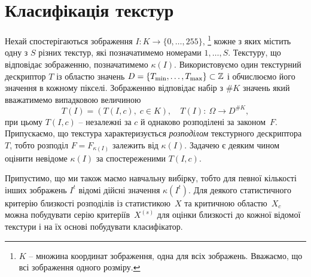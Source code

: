 
\section{Класифікація текстур}\label{section1.3}

Нехай спостерігаються зображення $I \colon K \to \{0,\dots,255\}$,%
\footnote{$K$ -- множина координат зображення, одна для всіх зображень. Вважаємо, що всі зображення одного розміру.}
кожне з яких містить одну з $S$ різних текстур, які позначатимемо номерами $1,\dots,S$.
Текстуру, що відповідає зображенню, позначатимемо $\kappa(I)$.
Використовуємо один текстурний дескриптор $T$ із областю значень $D = \{T_{\min},\dots,T_{\max}\} \subset \mathbb Z$ і обчислюємо його значення в кожному пікселі. 
Зображенню відповідає набір з $\# K$ значень який вважатимемо випадковою величиною
\[ T(I) = \left(T(I,c),\; c\in K\right), \quad T(I)\colon \ \Omega \to D^{\# K}, \]
при цьому $T(I,c)$ -- незалежні за $c$ й однаково розподілені за законом~$F$.
Припускаємо, що текстура характеризується \emph{розподілом} текстурного дескриптора $T$, тобто розподіл $F = F_{\kappa(I)}$ залежить від $\kappa(I)$.
Задачею є деяким чином оцінити невідоме $\kappa(I)$ за спостереженими $T(I,c)$.


Припустимо, що ми також маємо навчальну вибірку, тобто для певної кількості інших зображень $I^t$ відомі дійсні значення $\kappa(I^t)$. 
Для деякого статистичного критерію близкості розподілів із статистикою~$X$ та критичною областю~$X_c$ можна побудувати серію критеріїв~$X^{(s)}$ 
для оцінки близкості до кожної відомої текстури і на їх основі побудувати класифікатор.

